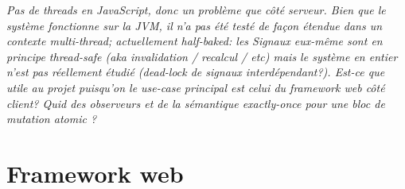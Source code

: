 \textit{Pas de threads en JavaScript, donc un problème que côté serveur. Bien que le système fonctionne sur la JVM, il n'a pas été testé de façon étendue dans un contexte multi-thread; actuellement half-baked: les Signaux eux-même sont en principe thread-safe (aka invalidation / recalcul / etc) mais le système en entier n'est pas réellement étudié (dead-lock de signaux interdépendant?). Est-ce que utile au projet puisqu'on le use-case principal est celui du framework web côté client? Quid des observeurs et de la sémantique exactly-once pour une bloc de mutation atomic{} ?}

\section{Framework web}
